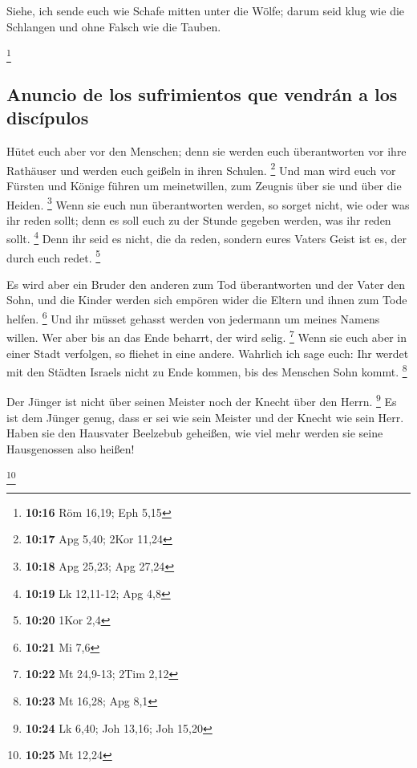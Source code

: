  Siehe, ich sende euch wie Schafe mitten unter die Wölfe;
darum seid klug wie die Schlangen und ohne Falsch wie die Tauben.

\footnote{\textbf{10:16} Röm 16,19; Eph 5,15}

\hypertarget{anuncio-de-los-sufrimientos-que-vendruxe1n-a-los-discuxedpulos}{%
\subsection{Anuncio de los sufrimientos que vendrán a los
discípulos}\label{anuncio-de-los-sufrimientos-que-vendruxe1n-a-los-discuxedpulos}}

 Hütet euch aber vor den Menschen; denn sie werden euch
überantworten vor ihre Rathäuser und werden euch geißeln in ihren
Schulen. \footnote{\textbf{10:17} Apg 5,40; 2Kor 11,24} 
Und man wird euch vor Fürsten und Könige führen um meinetwillen, zum
Zeugnis über sie und über die Heiden. \footnote{\textbf{10:18} Apg
  25,23; Apg 27,24}  Wenn sie euch nun überantworten
werden, so sorget nicht, wie oder was ihr reden sollt; denn es soll euch
zu der Stunde gegeben werden, was ihr reden sollt. \footnote{\textbf{10:19}
  Lk 12,11-12; Apg 4,8}  Denn ihr seid es nicht, die da
reden, sondern eures Vaters Geist ist es, der durch euch redet.
\footnote{\textbf{10:20} 1Kor 2,4}

 Es wird aber ein Bruder den anderen zum Tod
überantworten und der Vater den Sohn, und die Kinder werden sich empören
wider die Eltern und ihnen zum Tode helfen. \footnote{\textbf{10:21} Mi
  7,6}  Und ihr müsset gehasst werden von jedermann um
meines Namens willen. Wer aber bis an das Ende beharrt, der wird selig.
\footnote{\textbf{10:22} Mt 24,9-13; 2Tim 2,12}  Wenn sie
euch aber in einer Stadt verfolgen, so fliehet in eine andere. Wahrlich
ich sage euch: Ihr werdet mit den Städten Israels nicht zu Ende kommen,
bis des Menschen Sohn kommt. \footnote{\textbf{10:23} Mt 16,28; Apg 8,1}

 Der Jünger ist nicht über seinen Meister noch der Knecht
über den Herrn. \footnote{\textbf{10:24} Lk 6,40; Joh 13,16; Joh 15,20}
 Es ist dem Jünger genug, dass er sei wie sein Meister
und der Knecht wie sein Herr. Haben sie den Hausvater Beelzebub
geheißen, wie viel mehr werden sie seine Hausgenossen also heißen!

\footnote{\textbf{10:25} Mt 12,24}

